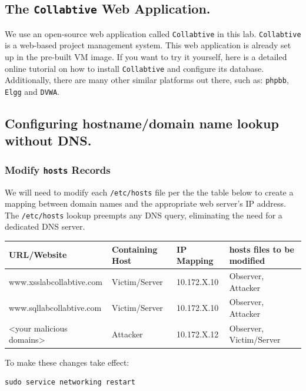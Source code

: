 \documentclass{article}
\begin{document}
\subsection{The {\tt Collabtive} Web Application.}
We use an open-source web application called {\tt Collabtive} in this lab.
{\tt Collabtive} is a web-based project management 
system.  This web application is already set up in the 
pre-built \ubuntu VM image. 
If you want to try it yourself, here is a detailed online
tutorial on how to install {\tt Collabtive} and configure its
database. Additionally, there are many other similar platforms out there, such as: {\tt phpbb}, {\tt Elgg} and {\tt DVWA}.


\subsection{Configuring hostname/domain name lookup without DNS.}
\subsubsection{Modify {\tt hosts} Records}
We will need to modify each \texttt{/etc/hosts} file per the the table below to create a mapping between 
domain names and the appropriate web server's IP address. The \texttt{/etc/hosts}  lookup preempts any DNS query, eliminating the need for a dedicated DNS server.  

\begin{table}[ht]
\centering
\label{my-label}
\begin{tabular}{|l|l|l|l|}
\hline
\textbf{URL/Website}                        & \textbf{Containing Host} & \textbf{IP Mapping} & \textbf{hosts files to be modified} \\ \hline
www.xsslabcollabtive.com                    & Victim/Server            & 10.172.X.10         & Observer, Attacker                  \\ \hline
www.sqllabcollabtive.com                    & Victim/Server            & 10.172.X.10         & Observer, Attacker                  \\ \hline
\textless your malicious domains\textgreater & Attacker                 & 10.172.X.12         & Observer, Victim/Server             \\ \hline
\end{tabular}
\end{table}

To make these changes take effect:
\begin{Verbatim}
sudo service networking restart
\end{Verbatim}
\end{document}
